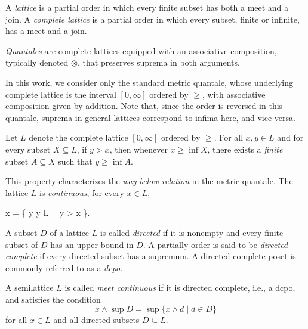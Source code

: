 \begin{definition}
   A \emph{lattice} is a partial order in which every finite subset has both a meet and a join. A \emph{complete lattice} is a partial order  in which every subset, finite or infinite, has a meet and a join.
\end{definition}

\begin{definition}
  \emph{Quantales} are complete lattices equipped with an associative composition, typically denoted $\otimes$, that preserves suprema in both arguments.
\end{definition}

\begin{example}
  In this work, we consider only the standard metric quantale, whose underlying complete lattice is the interval $[0, \infty]$ ordered by $\geq$, with associative composition given by addition. Note that, since the order is reversed in this quantale, suprema in general lattices correspond to infima here, and vice versa.
\end{example}


\begin{lemma} \cite{dahlqvist2022syntactic}
Let $L$ denote the complete lattice $[0, \infty]$ ordered by $\geq$.  
For all $x, y \in L$ and for every subset $X \subseteq L$, if $y > x$, then whenever $x \geq \inf X$, there exists a \emph{finite} subset $A \subseteq X$ such that $y \geq \inf A$.

This property characterizes the \emph{way-below relation} in the metric quantale. The lattice $L$ is \emph{continuous}, \ie for every $x \in L$,
	\begin{flalign*}
		x = \inf \{ y  \mid y \in L\  \ y > x \}.
	\end{flalign*}
\end{lemma}


\begin{definition}
  A subset $D$ of a lattice $L$ is called \emph{directed} if it is nonempty and every finite subset of $D$ has an upper bound in $D$. A partially order is said to be \emph{directed complete} if every directed subset has a supremum. A directed complete poset is commonly referred to as a \emph{dcpo}.
\end{definition}

\begin{definition}
  A semilattice $L$ is called \emph{meet continuous} if it is directed complete, i.e., a dcpo, and satisfies the condition
  \[
    x \wedge \sup D = \sup \{x \wedge d \mid d \in D\} \tag{MC}
  \]
  for all $x \in L$ and all directed subsets $D \subseteq L$.
\end{definition}

